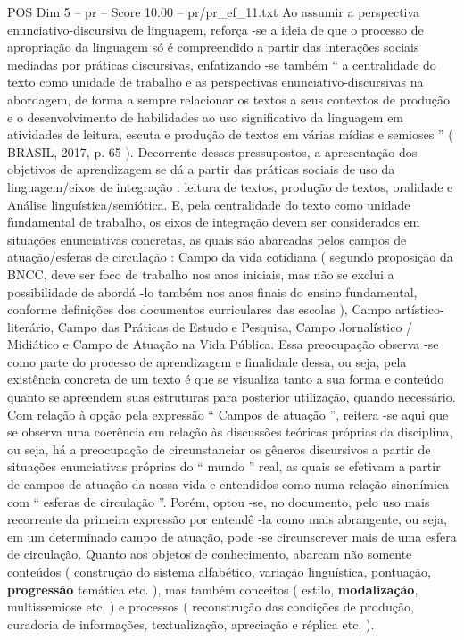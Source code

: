 \begin{textsample}{POS Dim 5 – pr – Score 10.00 – pr/pr\_ef\_11.txt}
Ao assumir a perspectiva enunciativo-discursiva de linguagem, reforça -se a ideia de que o processo de apropriação da linguagem só é compreendido a partir das interações sociais mediadas por práticas discursivas, enfatizando -se também “ a centralidade do texto como unidade de trabalho e as perspectivas enunciativo-discursivas na abordagem, de forma a sempre relacionar os textos a seus contextos de produção e o desenvolvimento de habilidades ao uso significativo da linguagem em atividades de leitura, escuta e produção de textos em várias mídias e semioses ” ( BRASIL, 2017, p. 65 ).
Decorrente desses pressupostos, a apresentação dos objetivos de aprendizagem se dá a partir das práticas sociais de uso da linguagem/eixos de integração : leitura de textos, produção de textos, oralidade e Análise linguística/semiótica.
E, pela centralidade do texto como unidade fundamental de trabalho, os eixos de integração devem ser considerados em situações enunciativas concretas, as quais são abarcadas pelos campos de atuação/esferas de circulação : Campo da vida cotidiana ( segundo proposição da BNCC, deve ser foco de trabalho nos anos iniciais, mas não se exclui a possibilidade de abordá -lo também nos anos finais do ensino fundamental, conforme definições dos documentos curriculares das escolas ), Campo artístico-literário, Campo das Práticas de Estudo e Pesquisa, Campo Jornalístico / Midiático e Campo de Atuação na Vida Pública.
Essa preocupação observa -se como parte do processo de aprendizagem e finalidade dessa, ou seja, pela existência concreta de um texto é que se visualiza tanto a sua forma e conteúdo quanto se apreendem suas estruturas para posterior utilização, quando necessário.
Com relação à opção pela expressão “ Campos de atuação ”, reitera -se aqui que se observa uma coerência em relação às discussões teóricas próprias da disciplina, ou seja, há a preocupação de circunstanciar os gêneros discursivos a partir de situações enunciativas próprias do “ mundo ” real, as quais se efetivam a partir de campos de atuação da nossa vida e entendidos como numa relação sinonímica com “ esferas de circulação ”.
Porém, optou -se, no documento, pelo uso mais recorrente da primeira expressão por entendê -la como mais abrangente, ou seja, em um determinado campo de atuação, pode -se circunscrever mais de uma esfera de circulação.
Quanto aos objetos de conhecimento, abarcam não somente conteúdos ( construção do sistema alfabético, variação linguística, pontuação, \textbf{progressão} temática etc. ), mas também conceitos ( estilo, \textbf{modalização}, multissemiose etc. ) e processos ( reconstrução das condições de produção, curadoria de informações, textualização, apreciação e réplica etc. ).

\end{textsample}
